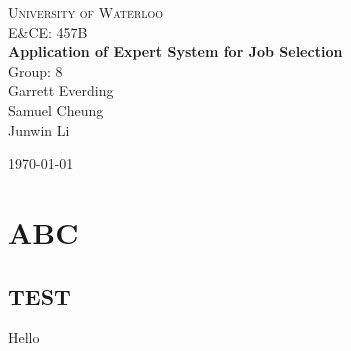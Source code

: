 \documentclass[12pt,fleqn,reqno,letterpaper]{article}
\begin{document}
\begin{titlepage}
\begin{center}
  \textsc{\LARGE University of Waterloo}\\[0.5cm]
  \textsc{\Large E\&CE: 457B}\\[0.5cm]
  \vfill
  { \huge \bfseries Application of Expert System for Job Selection \\[0.4cm] }
  \vfill
  Group: 8 \\
  Garrett Everding \\
  Samuel Cheung \\
  Junwin Li

  \vfill
  \today
\end{center}
\end{titlepage}
\tableofcontents
\clearpage
\listoffigures
\clearpage
\listoftables
\clearpage

\section{ABC}
\subsection{TEST}
Hello
\end{document}
